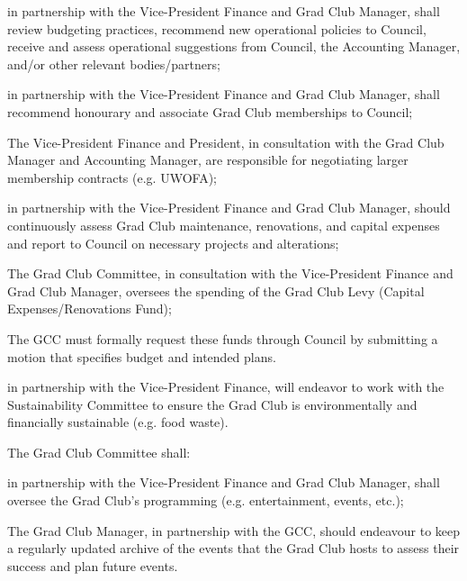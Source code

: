 \begin{longenum}[ label*=\thesubsection.\arabic*., align=left]
\begin{longenum}[ label*=\arabic*., align=left]
\begin{longenum}[ label*=\arabic*., align=left]
		\end{longenum}
	\item in partnership with the Vice-President Finance and Grad Club Manager, shall review budgeting practices, recommend new operational policies to Council, receive and assess operational suggestions from Council, the Accounting Manager, and/or other relevant bodies/partners;
	\item in partnership with the Vice-President Finance and Grad Club Manager, shall recommend honourary and associate Grad Club memberships to Council;
		\begin{longenum}[ label*=\arabic*., align=left]
		\item The Vice-President Finance and President, in consultation with the Grad Club Manager and Accounting Manager, are responsible for negotiating larger membership contracts (e.g. UWOFA);
		\end{longenum}
	\item in partnership with the Vice-President Finance and Grad Club Manager, should continuously assess Grad Club maintenance, renovations, and capital expenses and report to Council on necessary projects and alterations;
		\begin{longenum}[ label*=\arabic*., align=left]
		\item The Grad Club Committee, in consultation with the Vice-President Finance and Grad Club Manager, oversees the spending of the Grad Club Levy (Capital Expenses/Renovations Fund);
		\item The GCC must formally request these funds through Council by submitting a motion that specifies budget and intended plans.
		\end{longenum}
	\item in partnership with the Vice-President Finance, will endeavor to work with the Sustainability Committee to ensure the Grad Club is environmentally and financially sustainable (e.g. food waste).
	\end{longenum}
\item The Grad Club Committee shall:
	\begin{longenum}[ label*=\arabic*., align=left]
	\item in partnership with the Vice-President Finance and Grad Club Manager, shall oversee the Grad Club’s programming (e.g. entertainment, events, etc.);
		\begin{longenum}[ label*=\arabic*., align=left]
		\item The Grad Club Manager, in partnership with the GCC, should endeavour to keep a regularly updated archive of the events that the Grad Club hosts to assess their success and plan future events.

\end{longenum}
\end{longenum}
\end{longenum}
